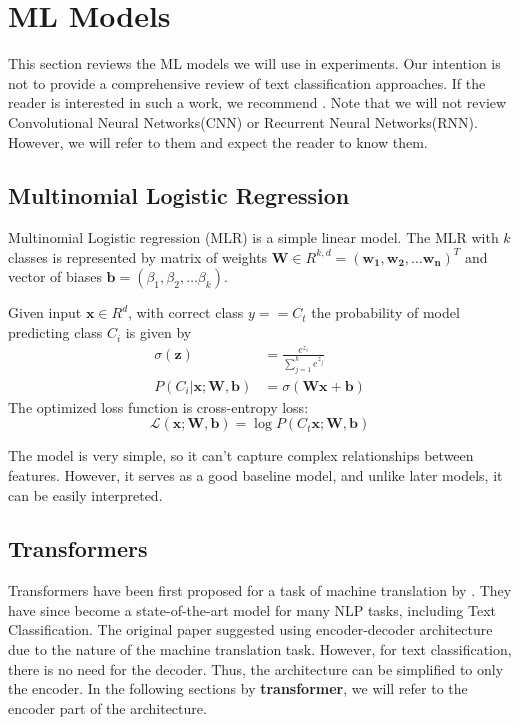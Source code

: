 \section{ML Models}
\label{sec:models}
This section reviews the ML models we will use in experiments.
Our intention is not to provide a comprehensive review of text classification approaches.
If the reader is interested in such a work, we recommend \cite{kowsariTextClassificationAlgorithms2019}.
Note that we will not review Convolutional Neural Networks(CNN) or Recurrent Neural Networks(RNN).
However, we will refer to them and expect the reader to know them.

\subsection{Multinomial Logistic Regression}
\label{sec:mlr}
Multinomial Logistic regression (MLR) is a simple linear model.
The MLR with $k$ classes is represented by matrix of weights $\mathbf{W} \in R^{k, d} = (\mathbf{w_1}, \mathbf{w_2}, \dots \mathbf{w_n})^T$
and vector of biases $\mathbf{b} = (\beta_1, \beta_2, \dots \beta_k)$.

Given input $\mathbf{x} \in R^{d}$, with correct class $y == C_t$ the probability of model predicting class $C_i$ is given by
\begin{align}
    \sigma(\mathbf{z}) &= \frac{e^{z_i}}{\sum_{j=1}^{k} e^{z_j}} \\
    P(C_i | \mathbf{x}; \mathbf{W}, \mathbf{b}) &= \sigma(\mathbf{W} \mathbf{x} + \mathbf{b})
\end{align}
The optimized loss function is cross-entropy loss:
\begin{equation}
    \mathcal{L}(\mathbf{x};\mathbf{W}, \mathbf{b}) = \log P(C_t \mathbf{x}; \mathbf{W}, \mathbf{b})
\end{equation}
 
The model is very simple, so it can't capture complex relationships between features.
However, it serves as a good baseline model, and unlike later models, it can be easily interpreted.

\subsection{Transformers}
\label{sec:transformers}
Transformers have been first proposed for a task of machine translation by \cite{vaswaniAttentionAllYou2017d}.
They have since become a state-of-the-art model for many NLP tasks, including Text Classification.
The original paper suggested using encoder-decoder architecture due to the nature of the machine translation task.
However, for text classification, there is no need for the decoder. Thus, the architecture can be simplified to only the encoder.
In the following sections by \textbf{transformer}, we will refer to the encoder part of the architecture.

